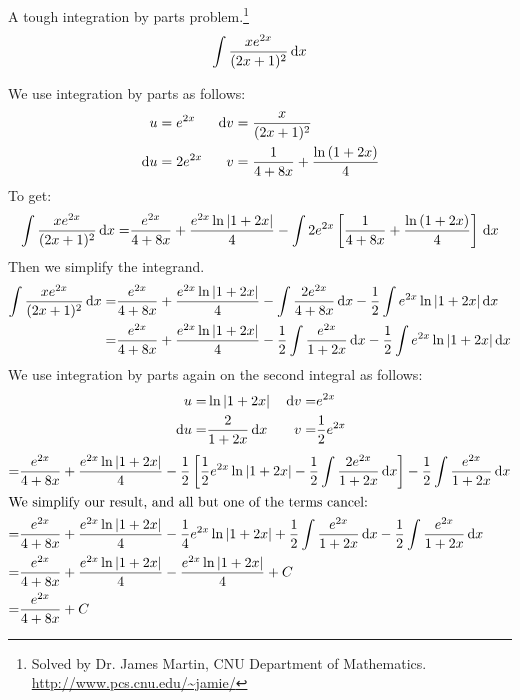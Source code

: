 \begin{ex} A tough integration by parts problem.\footnote{Solved by Dr. James Martin, CNU Department of Mathematics. \url{http://www.pcs.cnu.edu/~jamie/}}
	\[ \int \frac{xe^{2x}}{(2x+1)^2}\,\mathrm{d} x \]
  \begin{sol}
      We use integration by parts as follows:
      \begin{align*}
        u&=e^{2x} & \,\mathrm{d} v&=\frac{x}{(2x+1)^2} \\
        \,\mathrm{d} u &= 2e^{2x} & v &=\frac{1}{4+8x}+\frac{\ln{(1+2x)}}{4}
      \end{align*}
      To get:
      \begin{align*}
        \int \frac{xe^{2x}}{(2x+1)^2}\,\mathrm{d} x
        =& \frac{e^{2x}}{4+8x}+\frac{e^{2x}\ln{|1+2x|}}{4}-\int 2e^{2x}\left[\frac{1}{4+8x}+\frac{\ln{(1+2x)}}{4}\right]\,\mathrm{d} x \\
      \end{align*}
      Then we simplify the integrand.
      \begin{align*}
        \int \frac{xe^{2x}}{(2x+1)^2}\,\mathrm{d} x =& \frac{e^{2x}}{4+8x}+\frac{e^{2x}\ln{|1+2x|}}{4}-\int \frac{2e^{2x}}{4+8x}\,\mathrm{d} x-\frac{1}{2} \int e^{2x}\ln{|1+2x|}\,\mathrm{d} x \\
        =& \frac{e^{2x}}{4+8x}+\frac{e^{2x}\ln{|1+2x|}}{4}-\frac{1}{2}\int \frac{e^{2x}}{1+2x}\,\mathrm{d} x-\frac{1}{2} \int e^{2x}\ln{|1+2x|}\,\mathrm{d} x
      \end{align*}
      We use integration by parts again on the second integral as follows:
      \begin{align*}
        u=&\ln{|1+2x|} & \,\mathrm{d} v=&e^{2x} \\
        \,\mathrm{d} u=&\frac{2}{1+2x}\,\mathrm{d} x & v=& \frac{1}{2}e^{2x}
      \end{align*}
      \begin{align*}
        =& \frac{e^{2x}}{4+8x}+\frac{e^{2x}\ln{|1+2x|}}{4}
        -\frac{1}{2}\left[\frac{1}{2}e^{2x}\ln{|1+2x|}
          -\frac{1}{2} \int \frac{2e^{2x}}{1+2x} \,\mathrm{d} x\right]
          -\frac{1}{2}\int \frac{e^{2x}}{1+2x}\,\mathrm{d} x \\
          \intertext{We simplify our result, and all but one of the terms cancel:}
          =& \frac{e^{2x}}{4+8x}+\frac{e^{2x}\ln{|1+2x|}}{4}
          -\frac{1}{4}e^{2x}\ln{|1+2x|}
          + \frac{1}{2} \int \frac{e^{2x}}{1+2x} \,\mathrm{d} x
          -\frac{1}{2}\int \frac{e^{2x}}{1+2x}\,\mathrm{d} x \\
          =& \frac{e^{2x}}{4+8x}+\frac{e^{2x}\ln{|1+2x|}}{4}
          -\frac{e^{2x}\ln{|1+2x|}}{4}+C \\
          =& \frac{e^{2x}}{4+8x}+C
        \end{align*}
\end{sol}
\end{ex}
